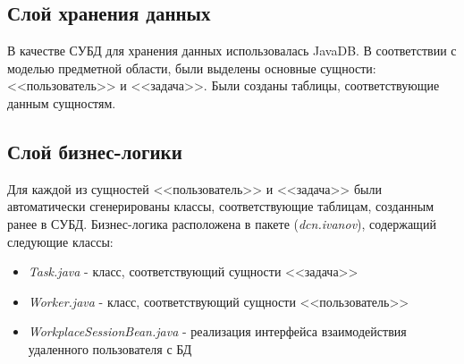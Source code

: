 \subsection{Слой хранения данных}
В качестве СУБД для хранения данных использовалась JavaDB. В соответствии с моделью предметной области, были выделены основные сущности: <<пользователь>> и <<задача>>. Были созданы таблицы, соответствующие данным сущностям.

\subsection{Слой бизнес-логики}
Для каждой из сущностей <<пользователь>> и <<задача>> были автоматически сгенерированы классы, соответствующие таблицам, созданным ранее в СУБД. Бизнес-логика расположена в пакете (\textit{dcn.ivanov}), содержащий следующие классы:
\begin{itemize}
	\item \textit{Task.java} - класс, соответствующий сущности <<задача>>
	\item \textit{Worker.java} - класс, соответствующий сущности <<пользователь>>
	\item \textit{WorkplaceSessionBean.java} - реализация интерфейса взаимодействия удаленного пользователя с БД
\end{itemize}